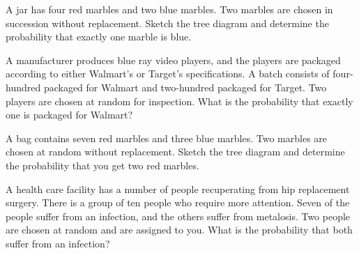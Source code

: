 \begin{problem}
\item A jar has four red marbles and two blue marbles. Two marbles are
  chosen in succession without replacement. Sketch the tree diagram
  and determine the probability that exactly one marble is blue.

  \vfill

\item A manufacturer produces blue ray video players, and the players
  are packaged according to either Walmart's or Target's
  specifications. A batch consists of four-hundred packaged for
  Walmart and two-hundred packaged for Target. Two players are chosen
  at random for inspection. What is the probability that exactly one
  is packaged for Walmart?

  \vfill

  \clearpage

\item A bag contains seven red marbles and three blue marbles. Two
  marbles are chosen at random without replacement. Sketch the tree
  diagram and determine the probability that you get two red marbles.

  \vfill

\item A health care facility has a number of people recuperating from
  hip replacement surgery. There is a group of ten people who require
  more attention. Seven of the people suffer from an infection, and
  the others suffer from metalosis. Two people are chosen at random
  and are assigned to you. What is the probability that both suffer
  from an infection?

  \vfill

\end{problem}



